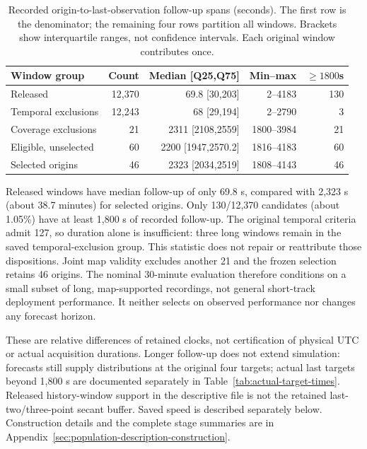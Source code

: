 \documentclass[11pt]{article}
\begin{document}
\begin{table}[htbp]
\centering\small
\caption{Recorded origin-to-last-observation follow-up spans (seconds). The first row is the denominator; the remaining four rows partition all windows. Brackets show interquartile ranges, not confidence intervals. Each original window contributes once.}
\label{tab:final-cohort-durations}
\begin{tabular}{@{}lrrrr@{}}
\toprule
Window group & Count & Median [Q25,Q75] & Min--max & $\geq1800$s\\
\midrule
Released & 12,370 & 69.8 [30,203] & 2--4183 & 130\\
Temporal exclusions & 12,243 & 68 [29,194] & 2--2790 & 3\\
Coverage exclusions & 21 & 2311 [2108,2559] & 1800--3984 & 21\\
Eligible, unselected & 60 & 2200 [1947,2570.2] & 1816--4183 & 60\\
Selected origins & 46 & 2323 [2034,2519] & 1808--4143 & 46\\
\bottomrule
\end{tabular}
\end{table}

Released windows have median follow-up of only 69.8 s, compared with 2,323 s
(about 38.7 minutes) for selected origins. Only 130/12,370 candidates
(about 1.05\%) have at least 1,800 s of recorded follow-up. The original
temporal criteria admit 127, so duration alone is insufficient:
three long windows remain in the saved temporal-exclusion group.
This statistic does not repair or reattribute those dispositions.
Joint map validity excludes another 21 and the frozen selection retains 46 origins.
The nominal 30-minute evaluation therefore conditions on a small subset of
long, map-supported recordings, not general short-track deployment performance.
It neither selects on observed performance nor changes any forecast horizon.

These are relative differences of retained clocks, not certification of
physical UTC or actual acquisition durations. Longer follow-up does not
extend simulation: forecasts still supply distributions at the original
four targets; actual last targets beyond 1,800 s are documented separately
in Table~\ref{tab:actual-target-times}. Released history-window support in
the descriptive file is not the retained last-two/three-point secant buffer.
Saved speed is described separately below. Construction details and the
complete stage summaries are in Appendix~\ref{sec:population-description-construction}.
\end{document}
